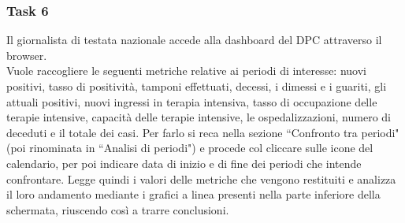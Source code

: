 \subsubsection{Task 6}
\label{sss:cw-task-6}

Il giornalista di testata nazionale accede alla dashboard del DPC attraverso il browser.\\
Vuole raccogliere le seguenti metriche relative ai periodi di interesse: nuovi positivi, tasso di positività, tamponi effettuati, decessi, i dimessi e i guariti, gli attuali positivi, nuovi ingressi in terapia intensiva, tasso di occupazione delle terapie intensive, capacità delle terapie intensive, le ospedalizzazioni, numero di deceduti e il totale dei casi.
Per farlo si reca nella sezione ``Confronto tra periodi" (poi rinominata in ``Analisi di periodi") e procede col cliccare sulle icone del calendario, per poi indicare data di inizio e di fine dei periodi che intende confrontare.
Legge quindi i valori delle metriche che vengono restituiti e analizza il loro andamento mediante i grafici a linea presenti nella parte inferiore della schermata, riuscendo così a trarre conclusioni. 